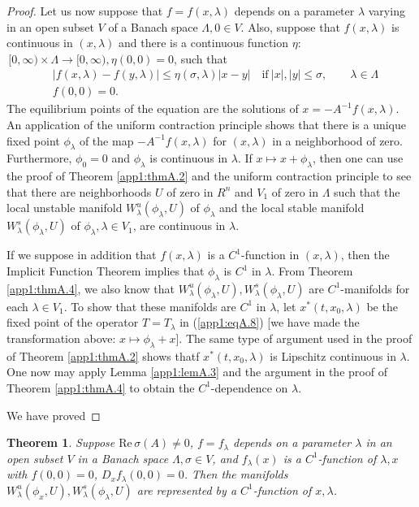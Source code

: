 \documentclass{surv-l}
\theoremstyle{plain}
\newtheorem{theorem}{Theorem}[section]
\theoremstyle{definition}
\numberwithin{equation}{section}
\numberwithin{figure}{chapter}
\begin{document}
\begin{proof}
Let us now suppose that $f=f(x, \lambda)$ depends on a parameter $\lambda$ varying in an open subset $V$ of a Banach space $\Lambda,0\in V$. Also, suppose that $f(x, \lambda)$ is continuous in $(x, \lambda)$ and there is a continuous function $\eta$:$\,[0, \infty)\times\Lambda\rightarrow[0, \infty),\eta(0,0)=0$, such that
\begin{align*}
&|f(x, \lambda)-f(y, \lambda)|\leq\eta(\sigma, \lambda)|x-y|\quad\mathrm{if}\ |x|,|y|\leq\sigma,\qquad\lambda\in\Lambda\\
&f(0,0)=0.
\end{align*}
The equilibrium points of the equation are the solutions of $x=-A^{-1}f(x, \lambda)$. An application of the uniform contraction principle shows that there is a unique fixed point $\phi_{\lambda}$ of the map $-A^{-1}f(x, \lambda)$ for $(x, \lambda)$ in a neighborhood of zero. Furthermore, $\phi_{0}=0$ and $\phi_{\lambda}$ is continuous in $\lambda$. If $x\mapsto x+\phi_{\lambda}$, then one can use the proof of Theorem \ref{app1:thmA.2} and the uniform contraction principle to see that there are neighborhoods $U$ of zero in $R^{n}$ and $V_{1}$ of zero in $\Lambda$ such that the local unstable manifold $W_{\lambda}^{u}(\phi_{\lambda}, U)$ of $\phi_{\lambda}$ and the local stable manifold $W_{\lambda}^{s}(\phi_{\lambda}, U)$ of $\phi_{\lambda},\lambda\in V_{1}$, are continuous in $\lambda$.

If we suppose in addition that $f(x, \lambda)$ is a $C^{1}$-function in $(x, \lambda)$, then the Implicit Function Theorem implies that $\phi_{\lambda}$ is $C^{1}$ in $\lambda$. From Theorem \ref{app1:thmA.4}, we also know that $W_{\lambda}^{u}(\phi_{\lambda}, U),W_{\lambda}^{s}(\phi_{\lambda}, U)$ are $C^{1}$-manifolds for each $\lambda\in V_{1}$. To show that these manifolds are $C^{1}$ in $\lambda$, let $x^{\ast}(t, x_{0}, \lambda)$ be the fixed point of the operator $T=T_{\lambda}$ in (\ref{app1:eqA.8}) [we have made the transformation above: $x\mapsto\phi_{\lambda}+x$]. The same type of argument used in the proof of Theorem \ref{app1:thmA.2} shows thatf $x^{\ast}(t, x_{0}, \lambda)$ is Lipschitz continuous in $\lambda$. One now may apply Lemma
\ref{app1:lemA.3} and the argument in the proof of Theorem \ref{app1:thmA.4} to obtain the $C^{1}$-dependence on $\lambda$.

We have proved
\end{proof}

\begin{theorem}\label{app1:thmA.5}
Suppose ${\mathrm{Re}}\,\sigma(A)\neq 0$, $f=f_{\lambda}$ depends on a parameter $\lambda$ in an open subset $V$ in a Banach space $\Lambda,\sigma\in V$, and $f_{\lambda}(x)$ is a $C^{1}$-function of $\lambda, x$ with $f(0,0)=0$, $D_{x}f_{\lambda}(0, 0)=0$. Then the manifolds $W_{\lambda}^{u}(\phi_{x}, U),W_{\lambda}^{s}(\phi_{\lambda}, U)$ are represented by a $C^{1}$-function of $x,\lambda$.
\end{theorem}
\end{document}
